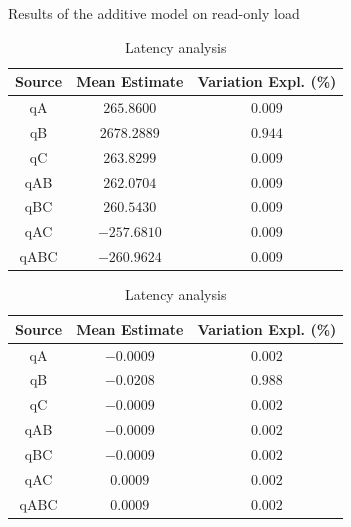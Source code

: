 \documentclass[11pt,a4paper]{article}
\begin{document}
\begin{table}[h]
\centering
{Results of the additive model on read-only load}
\begin{minipage}{.5\textwidth}
\centering
	\begin{tabular}{|c|c|c|}
	\hline 
	{\small Source} & {\small Mean Estimate} & {\small Variation Expl. (\%)} \\ 
	\hline 
	qA & $265.8600$ & $0.009$ \\ 
	\hline 
	qB & $2678.2889$ & $0.944$ \\ 
	\hline 
	qC & $263.8299$ & $0.009$ \\ 
	\hline 
	qAB & $262.0704$ & $0.009$ \\ 
	\hline 
	qBC & $260.5430$ & $0.009$ \\ 
	\hline 
	qAC & $-257.6810$ & $0.009$ \\ 
	\hline 
	qABC & $-260.9624$ & $0.009$ \\ 
	\hline 
	\end{tabular} \caption{Throughput analysis} \label{tab:2k-add-ro-tpt}
\end{minipage}%
\begin{minipage}{.5\textwidth}
\centering
	\begin{tabular}{|c|c|c|}
	\hline 
	{\small Source} & {\small Mean Estimate} & {\small Variation Expl. (\%)} \\ 
	\hline 
	qA & $-0.0009$ & $0.002$ \\ 
	\hline 
	qB & $-0.0208$ & $0.988$ \\ 
	\hline 
	qC & $-0.0009$ & $0.002$ \\ 
	\hline 
	qAB & $-0.0009$ & $0.002$ \\ 
	\hline 
	qBC & $-0.0009$ & $0.002$ \\ 
	\hline 
	qAC & $0.0009$ & $0.002$ \\ 
	\hline 
	qABC & $0.0009$ & $0.002$ \\ 
	\hline 
	\end{tabular} \caption{Latency analysis} \label{tab:2k-add-ro-lat}
\end{minipage}
\end{table}\label{tab:2k-add-ro}
\\
\end{document}
